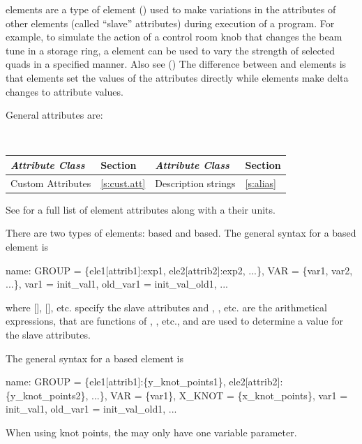  elements are a type of  element
() used to make variations in the attributes of
other elements (called ``slave'' attributes) during execution of a
program. For example, to simulate the action of a control room knob
that changes the beam tune in a storage ring, a  element can
be used to vary the strength of selected quads in a specified
manner. Also see  () The difference
between  and  elements is that 
elements set the values of the attributes directly while 
elements make delta changes to attribute values.

General  attributes are:
\begin{center}
\tt
\begin{tabular}{llll} \toprule
  {\sl Attribute Class}      & Section           & {\sl Attribute Class}      & Section         \\ \midrule
  Custom Attributes          & \ref{s:cust.att}  & Description strings        & \ref{s:alias}   \\ 
  \bottomrule
\end{tabular}
\end{center}
\toffset
See  for a full list of element attributes along with a their units.

There are two types of  elements:  based and  based.
The general syntax for a  based  element is
\begin{example}
  name: GROUP = \{ele1[attrib1]:exp1, ele2[attrib2]:exp2, ...\}, 
              VAR = \{var1, var2, ...\}, var1 = init_val1, old_var1 = init_val_old1, ...
\end{example}
where [], [], etc. specify the slave attributes and
, , etc. are the arithmetical expressions, that are functions of ,
, etc., and are used to determine a value for the slave attributes.

The general syntax for a  based   element is
\begin{example}
  name: GROUP = \{ele1[attrib1]:\{y_knot_points1\}, ele2[attrib2]:\{y_knot_points2\}, ...\}, 
              VAR = \{var1\}, X_KNOT = \{x_knot_points\},
              var1 = init_val1, old_var1 = init_val_old1, ...
\end{example}
When using knot points, the  may only have one variable parameter.

